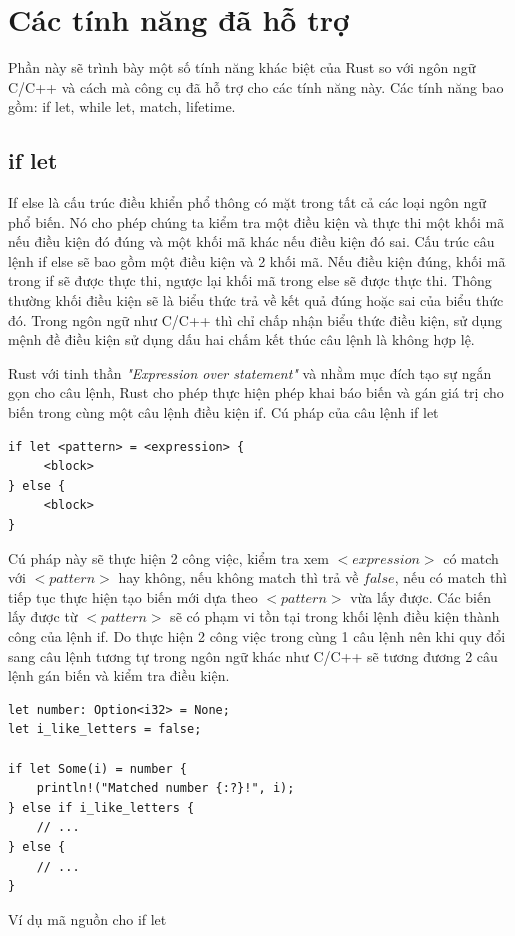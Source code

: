 \section{Các tính năng đã hỗ trợ}

Phần này sẽ trình bày một số tính năng khác biệt của Rust so với ngôn ngữ C/C++ và cách mà công cụ đã hỗ trợ cho các tính năng này. Các tính năng bao gồm: if let, while let, match, lifetime.

\subsection{if let}
If else là cấu trúc điều khiển phổ thông có mặt trong tất cả các loại ngôn ngữ phổ biến.
Nó cho phép chúng ta kiểm tra một điều kiện và thực thi một khối mã nếu điều kiện đó đúng và một khối mã khác nếu điều kiện đó sai.
Cấu trúc câu lệnh if else sẽ bao gồm một điều kiện và 2 khối mã.
Nếu điều kiện đúng, khối mã trong if sẽ được thực thi, ngược lại khối mã trong else sẽ được thực thi.
Thông thường khối điều kiện sẽ là biểu thức trả về kết quả đúng hoặc sai của biểu thức đó.
Trong ngôn ngữ như C/C++ thì chỉ chấp nhận biểu thức điều kiện, sử dụng mệnh đề điều kiện sử dụng dấu hai chấm kết thúc câu lệnh là không hợp lệ.

Rust với tinh thần \textit{"Expression over statement"} và nhằm mục đích tạo sự ngắn gọn cho câu lệnh, Rust cho phép thực hiện phép khai báo biến và gán giá trị cho biến trong cùng một câu lệnh điều kiện if.
Cú pháp của câu lệnh if let


\begin{verbatim}
if let <pattern> = <expression> {
     <block>
} else {
     <block>
}
\end{verbatim}


Cú pháp này sẽ thực hiện 2 công việc, kiểm tra xem $<expression>$ có match với $<pattern>$ hay không, nếu không match thì trả về $false$, nếu có match thì tiếp tục thực hiện tạo biến mới dựa theo $<pattern>$ vừa lấy được. Các biến lấy được từ $<pattern>$ sẽ có phạm vi tồn tại trong khối lệnh điều kiện thành công của lệnh if. Do thực hiện 2 công việc trong cùng 1 câu lệnh nên khi quy đổi sang câu lệnh tương tự trong ngôn ngữ khác như C/C++ sẽ tương đương 2 câu lệnh gán biến và kiểm tra điều kiện.

\begin{listing}[H]
\begin{verbatim}
let number: Option<i32> = None;
let i_like_letters = false;

if let Some(i) = number {
    println!("Matched number {:?}!", i);
} else if i_like_letters {
    // ...
} else {
    // ...
}
\end{verbatim}
\caption{Ví dụ mã nguồn cho if let}
\label{code:c4_iflet}
\end{listing}

